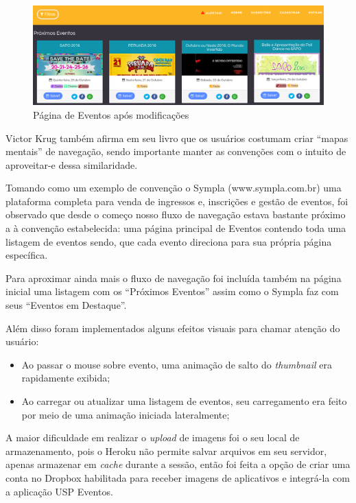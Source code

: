 \begin{figure}[htb]
\centering
\includegraphics[width=15cm]{figuras/events_page_3aiteracao}
\caption{\label{fig:events_page_3aiteracao} Página de Eventos após modificações}
\end{figure}
	\par Victor Krug também afirma em seu livro que os usuários costumam criar ``mapas mentais'' de navegação, sendo importante manter as convenções com o intuito de aproveitar-e dessa similaridade.
	\par Tomando como um exemplo de convenção o Sympla (www.sympla.com.br) uma plataforma completa para venda de ingressos e, inscrições e gestão de eventos, foi observado que desde o começo nosso fluxo de navegação estava bastante próximo a à
convenção estabelecida: uma página principal de Eventos contendo toda uma listagem de eventos sendo, que cada evento direciona para sua própria página específica.
	\par Para aproximar ainda mais o fluxo de navegação foi incluída também na página inicial uma listagem com os ``Próximos Eventos'' assim como o Sympla faz com seus ``Eventos em Destaque''.
	\par Além disso foram implementados alguns efeitos visuais para chamar atenção do usuário:
	\begin{itemize}
	\item Ao passar o mouse sobre evento, uma animação de salto do \emph{thumbnail} era rapidamente exibida;
	\item Ao carregar ou atualizar uma listagem de eventos, seu carregamento era feito por meio de uma animação iniciada lateralmente;
	\end{itemize}
	\par A maior dificuldade em realizar o \emph{upload} de imagens foi o seu local de armazenamento, pois o Heroku não permite salvar arquivos em seu servidor, apenas armazenar em \emph{cache} durante a sessão, então foi feita a opção de criar uma conta no Dropbox habilitada para receber imagens de aplicativos e integrá-la com a aplicação USP Eventos.

